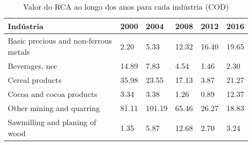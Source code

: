 \begin{table}
\centering
\caption{Valor do RCA ao longo dos anos para cada indústria (COD)}
\label{tab:ex3-tempo-COD}
\begin{tabular}{p{6cm}p{1.5cm}p{1.5cm}p{1.5cm}p{1.5cm}p{1.5cm}}
\toprule
                            Indústria &  2000 &   2004 &  2008 &  2012 &  2016 \\
\midrule
Basic precious and non-ferrous metals &  2.20 &   5.33 & 12.32 & 16.40 & 19.65 \\
                       Beverages, nec & 14.89 &   7.83 &  4.54 &  1.46 &  2.30 \\
                      Cereal products & 35.98 &  23.55 & 17.13 &  3.87 & 21.27 \\
             Cocoa and cocoa products &  3.34 &   3.38 &  1.26 &  0.89 & 12.37 \\
            Other mining and quarring & 81.11 & 101.19 & 65.46 & 26.27 & 18.83 \\
       Sawmilling and planing of wood &  1.35 &   5.87 & 12.68 &  2.70 &  3.24 \\
\bottomrule
\end{tabular}
\end{table}
